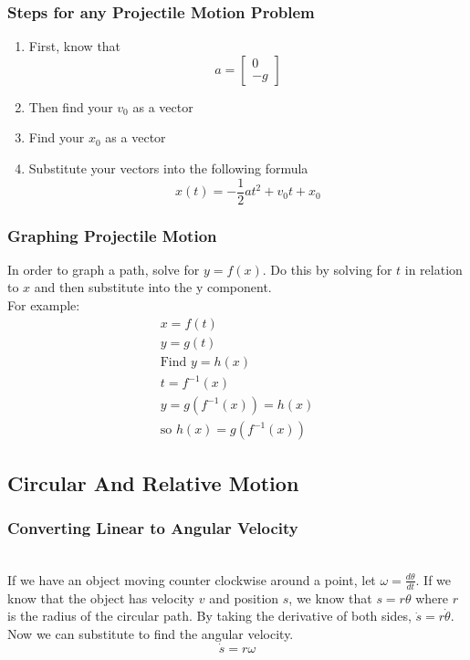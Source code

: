 \documentclass[12pt]{article}
\theoremstyle{break}
\numberwithin{theorem}{subsection}
\numberwithin{lemma}{subsection}
\numberwithin{corollary}{subsection}
\numberwithin{equation}{subsection}
\begin{document}
\subsubsection{Steps for any Projectile Motion Problem}
\begin{enumerate}
	\item First, know that 
	\begin{equation*}
	a = 
	\begin{bmatrix}
	0 \\ -g
	\end{bmatrix}
	\end{equation*}
	\item Then find your $v_0$ as a vector 
	\item Find your $x_0$ as a vector
	\item Substitute your vectors into the following formula
	\begin{equation*}
		x(t) = -\frac12 at^2 + v_0 t + x_0
	\end{equation*}
\end{enumerate}

\subsubsection{Graphing Projectile Motion}
In order to graph a path, solve for $y = f(x)$. Do this by solving for $t$ in relation to $x$ and 
then substitute into the y component. \\
For example: 
\begin{align*}
x = f(t) \\
y = g(t) \\
\text{Find } y = h(x) \\
t = f^{-1}(x) \\
y = g(f^{-1}(x)) = h(x) \\
\text{so } h(x) = g(f^{-1}(x))
\end{align*}

\subsection{Circular And Relative Motion}
\subsubsection{Converting Linear to Angular Velocity} \mbox{}\\
If we have an object moving counter clockwise around a point, let $\omega = \frac{d \theta}{dt}$. If
we know that the object has velocity $v$ and position $s$, we know that $s=r\theta$ where $r$ is the
radius of the circular path. By taking the derivative of both sides, $\dot{s} = r \dot{\theta}$. 
Now we can substitute to find the angular velocity.
\begin{equation*}
\dot{s} = r \omega
\end{equation*}
\end{document}
